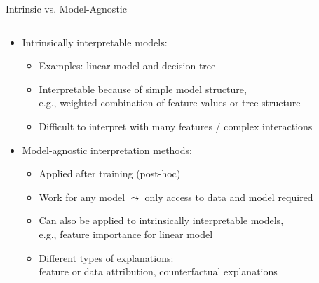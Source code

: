 \documentclass[11pt,compress,t,notes=noshow, aspectratio=169, xcolor=table]{beamer}
\begin{document}
\begin{frame}{Intrinsic vs. Model-Agnostic}
		\begin{columns}
		\begin{column}{0.75\textwidth}
	\begin{itemize}
		\item<1-> Intrinsically interpretable models:
		\medskip
		
		\begin{itemize}
			\item Examples: linear model and decision tree
			\item Interpretable because of simple model structure, \\
			e.g., weighted combination of feature values or tree structure
			\item Difficult to interpret with many features / complex interactions
		\end{itemize}
		
	\medskip
		\item<2-> Model-agnostic interpretation methods:
		\medskip
		\begin{itemize}
			\item Applied after training (post-hoc)
			\item Work for any model $\leadsto$ only access to data and model required
			\item Can also be applied to intrinsically interpretable models,\\ e.g., feature importance for linear model %
			\item Different types of explanations:\\
			feature or data attribution, counterfactual explanations
		\end{itemize}
	\end{itemize}
	\end{column}
	\begin{column}{0.25\textwidth}
		
\end{column}
\end{columns}
\end{frame}
\end{document}
